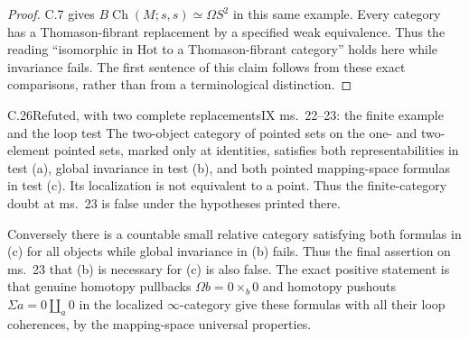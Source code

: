 \begin{proof}
C.7 gives $B\operatorname{Ch}(M;s,s)\simeq\Omega S^2$ in this
same example. Every category has a Thomason-fibrant replacement
by a specified weak equivalence. Thus the reading ``isomorphic in
$\mathrm{Hot}$ to a Thomason-fibrant category'' holds here while
invariance fails. The first sentence of this claim follows from
these exact comparisons, rather than from a terminological
distinction.
\end{proof}

\begin{claim}{C.26}{Refuted, with two complete replacements}{IX ms.~22--23: the finite example and the loop test}
The two-object category of pointed sets on the one- and two-element
pointed sets, marked only at identities, satisfies both
representabilities in test (a), global invariance in test (b), and
both pointed mapping-space formulas in test (c). Its localization
is not equivalent to a point. Thus the finite-category doubt at
ms.~23 is false under the hypotheses printed there.

Conversely there is a countable small relative category satisfying
both formulas in (c) for all objects while global invariance in
(b) fails. Thus the final assertion on ms.~23 that (b) is
necessary for (c) is also false. The exact positive statement is
that genuine homotopy pullbacks $\Omega b=0\times_b0$ and
homotopy pushouts $\Sigma a=0\amalg_a0$ in the localized
$\infty$-category give these formulas with all their loop
coherences, by the mapping-space universal properties.
\end{claim}
